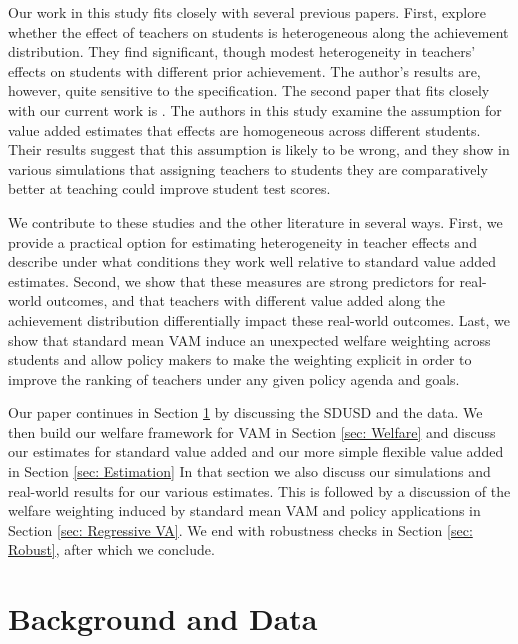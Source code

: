 \documentclass[letterpaper,12pt]{article}
\begin{document}
Our work in this study fits closely with several previous papers. First, \citet{lockwood2009} explore whether the effect of teachers on students is heterogeneous along the achievement distribution. They find significant, though modest heterogeneity in teachers' effects on students with different prior achievement. The author's results are, however, quite sensitive to the specification. The second paper that fits closely with our current work is \citet{condie2014teacher}. The authors in this study examine the assumption for value added estimates that effects are homogeneous across different students. Their results suggest that this assumption is likely to be wrong, and they show in various simulations that assigning teachers to students they are comparatively better at teaching could improve student test scores.

We contribute to these studies and the other literature in several ways. First, we provide a practical option for estimating heterogeneity in teacher effects and describe under what conditions they work well relative to standard value added estimates. Second, we show that these measures are strong predictors for real-world outcomes, and that teachers with different value added along the achievement distribution differentially impact these real-world outcomes. Last, we show that standard mean VAM induce an unexpected welfare weighting across students and allow policy makers to make the weighting explicit in order to improve the ranking of teachers under any given policy agenda and goals.

Our paper continues in Section \ref{sec: Data} by discussing the SDUSD and the data. We then build our welfare framework for VAM in Section \ref{sec: Welfare} and discuss our estimates for standard value added and our more simple flexible value added in Section \ref{sec: Estimation} In that section we also discuss our simulations and real-world results for our various estimates. This is followed by a discussion of the welfare weighting induced by standard mean VAM and policy applications in Section \ref{sec: Regressive VA}. We end with robustness checks in Section \ref{sec: Robust}, after which we conclude.




\section{Background and Data}\label{sec: Data}
\end{document}
